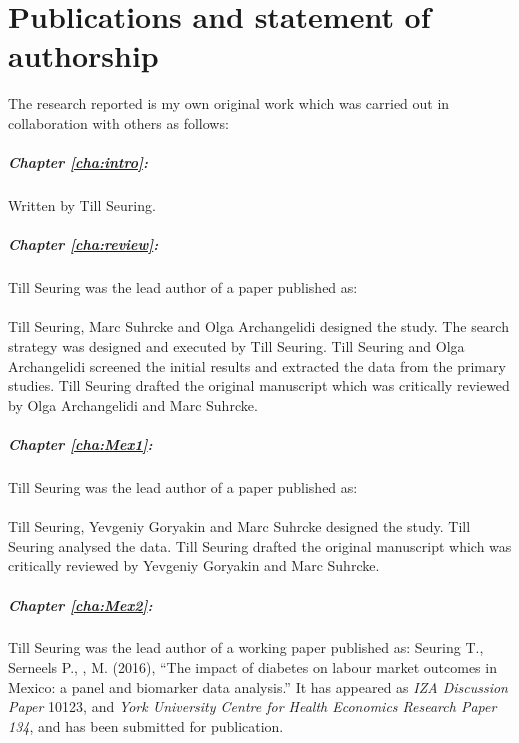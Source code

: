 \chapter*{\label{publication_statement}Publications and statement of authorship}


The research reported is my own original work which was carried out in collaboration with
others as follows:

\paragraph{Chapter \ref{cha:intro}:} Written by Till Seuring. 

\paragraph{Chapter \ref{cha:review}:} Till Seuring was the lead author of a paper published as:
\\[12pt]
\noindent{}
\\[12pt]
\noindent Till Seuring, Marc Suhrcke and Olga Archangelidi designed the study. The search strategy was designed and executed by Till Seuring. Till Seuring and Olga Archangelidi screened the initial results and extracted the data from the primary studies. Till Seuring drafted the original manuscript which was critically reviewed by Olga Archangelidi and Marc Suhrcke.

\paragraph{Chapter \ref{cha:Mex1}:} Till Seuring was the lead author of a paper published as:
\\[12pt]
\noindent{}
\\[12pt]
\noindent Till Seuring, Yevgeniy Goryakin and Marc Suhrcke  designed the study. Till Seuring analysed the data. Till Seuring drafted the original manuscript which was critically reviewed by Yevgeniy Goryakin and Marc Suhrcke.


\paragraph{Chapter \ref{cha:Mex2}:} Till Seuring was the lead author of a working paper published as: 
Seuring T., Serneels P., \DIFdelbegin {}\DIFdelend \DIFaddbegin {}\DIFaddend , M. (2016), ``The impact of diabetes on labour market outcomes in Mexico: a panel and biomarker data analysis.'' It has appeared as \textit{IZA Discussion Paper} 10123, and \textit{York University Centre for Health Economics Research Paper 134}, and has been submitted for publication.

